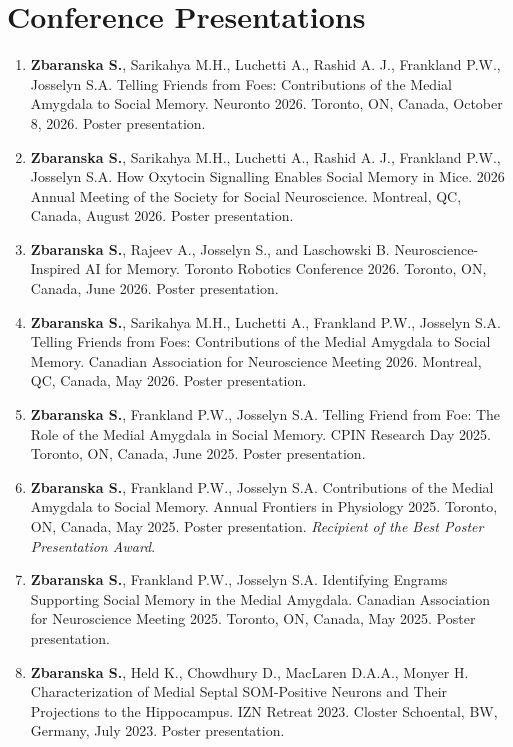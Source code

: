 \documentclass[12pt]{article}
\begin{document}
\section*{Conference Presentations}
\begin{enumerate}
    \item \textbf{Zbaranska S.}, Sarikahya M.H., Luchetti A., Rashid A. J., Frankland P.W., Josselyn S.A. Telling Friends from Foes: Contributions of the Medial Amygdala to Social Memory. Neuronto 2026. Toronto, ON, Canada, October 8, 2026. Poster presentation.
    \item \textbf{Zbaranska S.}, Sarikahya M.H., Luchetti A., Rashid A. J., Frankland P.W., Josselyn S.A. How Oxytocin Signalling Enables Social Memory in Mice. 2026 Annual Meeting of the Society for Social Neuroscience. Montreal, QC, Canada, August 2026. Poster presentation.
    \item \textbf{Zbaranska S.}, Rajeev A., Josselyn S., and Laschowski B. Neuroscience-Inspired AI for Memory. Toronto Robotics Conference 2026. Toronto, ON, Canada, June 2026. Poster presentation.
    \item \textbf{Zbaranska S.}, Sarikahya M.H., Luchetti A., Frankland P.W., Josselyn S.A. Telling Friends from Foes: Contributions of the Medial Amygdala to Social Memory. Canadian Association for Neuroscience Meeting 2026. Montreal, QC, Canada, May 2026. Poster presentation.
    \item \textbf{Zbaranska S.}, Frankland P.W., Josselyn S.A. Telling Friend from Foe: The Role of the Medial Amygdala in Social Memory. CPIN Research Day 2025. Toronto, ON, Canada, June 2025. Poster presentation.
    \item \textbf{Zbaranska S.}, Frankland P.W., Josselyn S.A. Contributions of the Medial Amygdala to Social Memory. Annual Frontiers in Physiology 2025. Toronto, ON, Canada, May 2025. Poster presentation. \textit{Recipient of the Best Poster Presentation Award}.
    \item \textbf{Zbaranska S.}, Frankland P.W., Josselyn S.A. Identifying Engrams Supporting Social Memory in the Medial Amygdala. Canadian Association for Neuroscience Meeting 2025. Toronto, ON, Canada, May 2025. Poster presentation.
    \item \textbf{Zbaranska S.}, Held K., Chowdhury D., MacLaren D.A.A., Monyer H. Characterization of Medial Septal SOM-Positive Neurons and Their Projections to the Hippocampus. IZN Retreat 2023. Closter Schoental, BW, Germany, July 2023. Poster presentation.
\end{enumerate}
\end{document}
